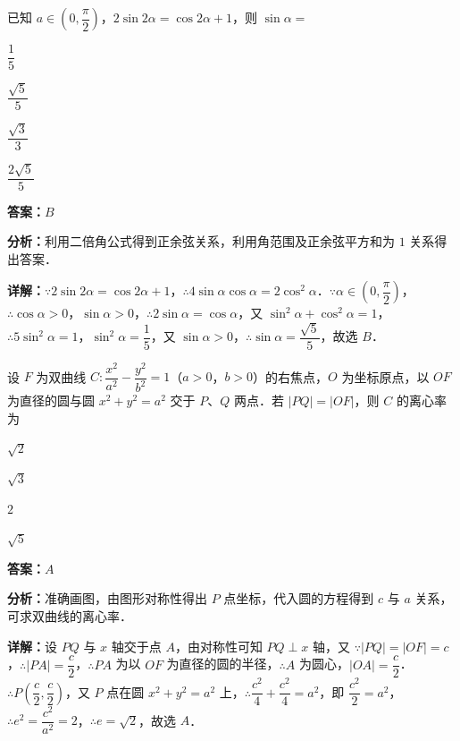\begin{question}[points=5]
已知 $a\in\left(0,\dfrac{\pi}{2}\right)$，$2\sin2\alpha=\cos2\alpha+1$，则 $\sin\alpha=$
\begin{choices}
  \item $\dfrac{1}{5}$
  \item $\dfrac{\sqrt{5}}{5}$
  \item $\dfrac{\sqrt{3}}{3}$
  \item $\dfrac{2\sqrt{5}}{5}$
\end{choices}
\begin{solution}
\textbf{答案：}$B$

\textbf{分析：}利用二倍角公式得到正余弦关系，利用角范围及正余弦平方和为 $1$ 关系得出答案．

\textbf{详解：}$\because 2\sin2\alpha=\cos2\alpha+1$，$\therefore 4\sin\alpha\cos\alpha=2\cos^2\alpha$．$\because \alpha\in\left(0,\dfrac{\pi}{2}\right)$，$\therefore \cos\alpha>0$，$\sin\alpha>0$，$\therefore 2\sin\alpha=\cos\alpha$，又 $\sin^2\alpha+\cos^2\alpha=1$，$\therefore 5\sin^2\alpha=1$，$\sin^2\alpha=\dfrac{1}{5}$，又 $\sin\alpha>0$，$\therefore \sin\alpha=\dfrac{\sqrt{5}}{5}$，故选 $B$．
\end{solution}
\end{question}

\begin{question}[points=5]
设 $F$ 为双曲线 $C:\dfrac{x^2}{a^2}-\dfrac{y^2}{b^2}=1$（$a>0$，$b>0$）的右焦点，$O$ 为坐标原点，以 $OF$ 为直径的圆与圆 $x^2+y^2=a^2$ 交于 $P$、$Q$ 两点．若 $|PQ|=|OF|$，则 $C$ 的离心率为
\begin{choices}
  \item $\sqrt{2}$
  \item $\sqrt{3}$
  \item $2$
  \item $\sqrt{5}$
\end{choices}
\begin{solution}
\textbf{答案：}$A$

\textbf{分析：}准确画图，由图形对称性得出 $P$ 点坐标，代入圆的方程得到 $c$ 与 $a$ 关系，可求双曲线的离心率．

\textbf{详解：}设 $PQ$ 与 $x$ 轴交于点 $A$，由对称性可知 $PQ\perp x$ 轴，又 $\because |PQ|=|OF|=c$，$\therefore |PA|=\dfrac{c}{2}$，$\therefore PA$ 为以 $OF$ 为直径的圆的半径，$\therefore A$ 为圆心，$|OA|=\dfrac{c}{2}$．$\therefore P\left(\dfrac{c}{2},\dfrac{c}{2}\right)$，又 $P$ 点在圆 $x^2+y^2=a^2$ 上，$\therefore \dfrac{c^2}{4}+\dfrac{c^2}{4}=a^2$，即 $\dfrac{c^2}{2}=a^2$，$\therefore e^2=\dfrac{c^2}{a^2}=2$，$\therefore e=\sqrt{2}$，故选 $A$．
\end{solution}
\end{question}

